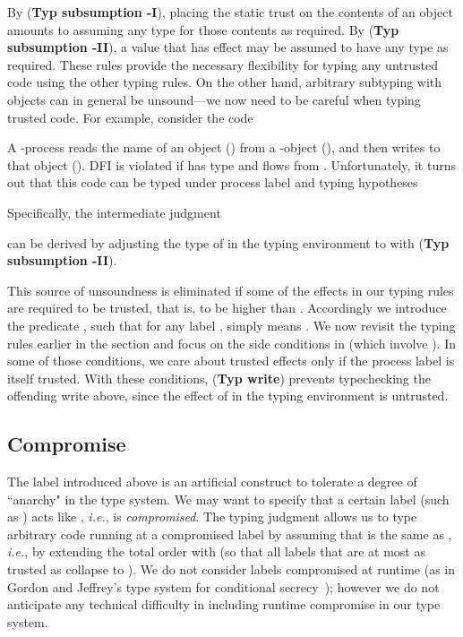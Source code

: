 \documentclass{sigplanconf}
\newcommand{\trule}[1]{(\textbf{Typ #1})}
\begin{document}
\noindent
By \trule{subsumption -I}, placing the static trust  on the contents of an object amounts to assuming any type for those contents as required. By \trule{subsumption -II}, a value that has effect  may be assumed to have any type as required. These rules provide the necessary flexibility for typing any untrusted code using the other typing rules. On the other hand, arbitrary subtyping with objects can in general be unsound---we now need to be careful when typing trusted code. For example, consider the code

A -process reads the name of an object () from a -object (), and then writes  to that object (). DFI is violated if  has type  and  flows from . Unfortunately, it turns out that this code can be typed under process label  and typing hypotheses
 
Specifically, the intermediate judgment

can be derived by adjusting the type of  in the typing environment to  with \trule{subsumption -II}. 

This source of unsoundness is eliminated if some of the effects in our typing rules are required to be trusted, that is, to be higher than . Accordingly we introduce the predicate , such that for any label ,  simply means . We now revisit the typing rules earlier in the section and focus on the side conditions in  (which involve ). In some of those conditions, we care about trusted effects only if the process label is itself trusted. With these conditions, \trule{write} prevents typechecking the offending write above, since the effect of  in the typing environment is untrusted.

\subsection{Compromise}
The label  introduced above is an artificial construct to tolerate a degree of ``anarchy" in the type system. We may want to specify that a certain label (such as ) acts like , \emph{i.e.}, is \emph{compromised}. The typing judgment  allows us to type arbitrary code  running at a compromised label  by assuming that  is the same as , \emph{i.e.}, by extending the total order with  (so that all labels that are at most as trusted as  collapse to ). We do not consider labels compromised at runtime (as in Gordon and
Jeffrey's type system for conditional secrecy~\cite{gordonjeffrey05});
however we do not anticipate any technical difficulty in including runtime compromise in our type
system. 
\end{document}

